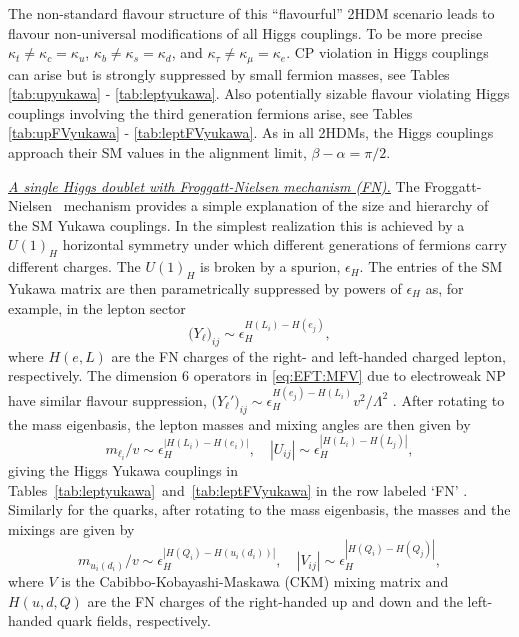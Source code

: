 \documentclass[../report.tex]{subfiles}
\begin{document}
The non-standard flavour structure
of this ``flavourful'' 2HDM scenario leads to flavour non-universal modifications of all Higgs couplings. To be more precise $\kappa_t \neq \kappa_c = \kappa_u$, $\kappa_b \neq \kappa_s = \kappa_d$, and $\kappa_\tau \neq \kappa_\mu = \kappa_e$. CP violation in Higgs couplings can arise but is strongly suppressed by small fermion masses, see Tables \ref{tab:upyukawa} - \ref{tab:leptyukawa}. Also potentially sizable flavour violating Higgs couplings involving the third generation fermions arise, see Tables \ref{tab:upFVyukawa} - \ref{tab:leptFVyukawa}.
As in all 2HDMs, the Higgs couplings approach their SM values in the alignment limit, $\beta-\alpha=\pi/2$.



\underline{\it A single Higgs doublet with Froggatt-Nielsen mechanism (FN).}
The Froggatt-Nielsen~\cite{Froggatt:1978nt} mechanism provides a simple explanation of the size and hierarchy of the SM Yukawa couplings. In the simplest realization this is achieved by a $U(1)_H$ horizontal symmetry under which different generations of fermions carry different charges. The $U(1)_H$ is broken by a spurion, $\epsilon_H$.
The entries of the SM Yukawa matrix are then parametrically suppressed by powers of $\epsilon_H$ as, for example, in the lepton sector
\begin{equation}
\big(Y_\ell\big)_{ij}\sim \epsilon_H^{H(L_i)-H(e_j)},
\end{equation}
where $H(e,L)$ are the FN charges of the right- and left-handed charged lepton, respectively. The dimension 6 operators in \eqref{eq:EFT:MFV} due to electroweak NP have similar flavour suppression, $\big(Y_\ell'\big)_{ij}\sim \epsilon_H^{H(e_j)-H(L_i)} v^2/\Lambda^2$ \cite{Dery:2013rta,Dery:2014kxa}. After rotating to the mass eigenbasis, the lepton masses and mixing angles are then given by~\cite{Leurer:1993gy,Grossman:1995hk}
\begin{equation}
m_{\ell_i}/v \sim \epsilon_H^{|H(L_i)-H(e_i)|},\quad
	|U_{ij}|\sim \epsilon_H^{|H(L_i)-H(L_j)|},
\end{equation}
giving the Higgs Yukawa couplings in Tables~\ref{tab:leptyukawa}~and~\ref{tab:leptFVyukawa} in the row labeled `FN' \cite{Dery:2014kxa}.
Similarly for the quarks, after rotating to the mass eigenbasis, the masses and the mixings are given by~\cite{Leurer:1993gy} 
\begin{equation}
m_{u_i(d_i)}/v \sim \epsilon_H^{|H(Q_i)-H(u_i(d_i))|},\quad
|V_{ij}|\sim \epsilon_H^{|H(Q_i)-H(Q_j)|},
\end{equation}
where $V$ is the Cabibbo-Kobayashi-Maskawa (CKM) mixing matrix and $H(u,d,Q)$ are the FN charges of the right-handed up and down and the left-handed quark fields, respectively.
\end{document}
